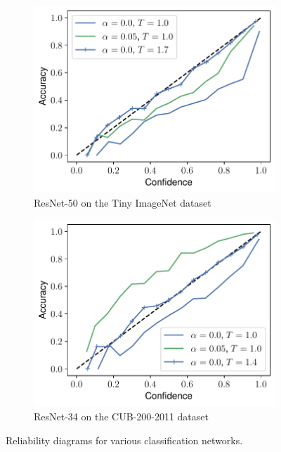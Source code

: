 \begin{figure}[ht]
\begin{subfigure}{.45\textwidth}
    \centering
    \includegraphics[width=\linewidth]{figures/reliability_resnet50_tinyimagenet.pdf}
    \caption{ResNet-50 on the Tiny ImageNet dataset}
\end{subfigure}
\hfill
\begin{subfigure}{.45\textwidth}
    \centering
    \includegraphics[width=\linewidth]{figures/reliability_resnet34_cub200.pdf}
    \caption{ResNet-34 on the CUB-200-2011 dataset}
\end{subfigure}
\caption{Reliability diagrams for various classification networks.}
\end{figure}